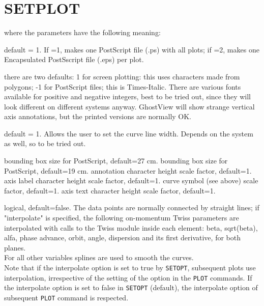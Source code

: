 \section{SETPLOT}
\label{sec:setplot}

where the parameters have the following meaning: 
\begin{madlist}
    default = 1. If =1, makes one PostScript file (.ps) with
     all plots; if =2, makes one Encapsulated PostSscript file (.eps)
     per plot.   

    there are two defaults: 1 for screen plotting: this uses
     characters made from polygons; -1 for PostScript files; this is
     Times-Italic. There are various fonts available for positive and
     negative integers, best to be tried out, since they will look
     different on different systems anyway. GhostView will show strange
     vertical axis annotations, but the printed versions are normally
     OK.   

    default = 1. Allows the user to set the curve line
     width.  Depends on the system as well, so to be tried out.   

    bounding box size for PostScript, default=27 cm.   
    bounding box size for PostScript, default=19 cm.   
    annotation character height scale factor, default=1.   
    axis label character height scale factor, default=1.  
    curve symbol (see above) scale factor, default=1.  
    axis text character height scale factor, default=1.  

    logical, default=false. The data points are
     normally connected by straight lines; if "interpolate" is
     specified, the following on-momentum Twiss parameters are
     interpolated with calls to the Twiss module inside 
     each element:  beta, sqrt(beta), alfa, phase advance, orbit, angle,
     dispersion and its first derivative, for both planes. \\ 
     For all other variables splines are used to smooth the curves. \\  
     Note that if the interpolate option is set to true by \texttt{SETOPT},
     subsequent plots use interpolation, irrespective of the
     setting of the option in the \texttt{PLOT} commands. If the interpolate
     option is set to false in \texttt{SETOPT} (default), the interpolate
     option of subsequent \texttt{PLOT} command is respected.

\end{madlist}


